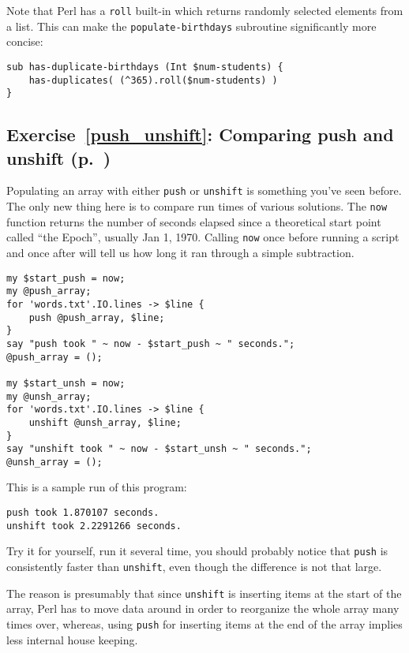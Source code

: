 Note that Perl has a {\tt roll} built-in which returns 
randomly selected elements from a list. This can make 
the {\tt populate-birthdays} subroutine significantly 
more concise:

\begin{verbatim}
sub has-duplicate-birthdays (Int $num-students) {
    has-duplicates( (^365).roll($num-students) )
}
\end{verbatim}

\subsection{Exercise~\ref{push_unshift}: Comparing push and unshift (p.~\pageref{push_unshift})}
\label{sol_push_unshift}

Populating an array with either {\tt push} or 
{\tt unshift} is something you've seen before. The only new thing 
here is to compare run times of various solutions.
The {\tt now} function returns the number of seconds 
elapsed since a theoretical start point called ``the 
Epoch'', usually Jan 1, 1970. Calling {\tt now} once 
before running a script and once after will tell 
us how long it ran through a simple subtraction.

\begin{verbatim}
my $start_push = now;
my @push_array;
for 'words.txt'.IO.lines -> $line {
    push @push_array, $line;
}
say "push took " ~ now - $start_push ~ " seconds.";
@push_array = ();

my $start_unsh = now;
my @unsh_array;
for 'words.txt'.IO.lines -> $line {
    unshift @unsh_array, $line;
}
say "unshift took " ~ now - $start_unsh ~ " seconds.";
@unsh_array = ();
\end{verbatim}

This is a sample run of this program:
\begin{verbatim}
push took 1.870107 seconds.
unshift took 2.2291266 seconds.
\end{verbatim}

Try it for yourself, run it several time, you should 
probably notice that {\tt push} is consistently 
faster than {\tt unshift}, even though the difference 
is not that large.

The reason is presumably that since {\tt unshift} is 
inserting items at the start of the array, Perl has 
to move data around in order to reorganize the whole 
array many times over, whereas, using {\tt push} 
for inserting items at the end of the array implies 
less internal house keeping.

